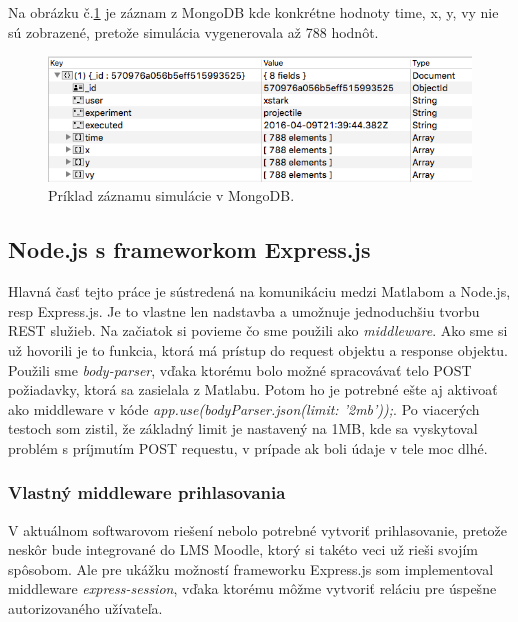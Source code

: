 Na obrázku č.\ref{img-mongo-record} je záznam z MongoDB kde konkrétne hodnoty time, x, y, vy nie sú zobrazené, pretože simulácia vygenerovala až 788 hodnôt.

\begin{figure}[H]
  \centering
  \includegraphics[scale=0.7]{img/code/mongodb-record.png}
  \caption{Príklad záznamu simulácie v MongoDB.}
  \label{img-mongo-record}
\end{figure}


\subsection{Node.js s frameworkom Express.js}
Hlavná časť tejto práce je sústredená na komunikáciu medzi Matlabom a Node.js, resp Express.js. Je to vlastne len nadstavba a umožnuje jednoduchšiu tvorbu REST služieb. Na začiatok si povieme čo sme použili ako \textit{middleware}. Ako sme si už hovorili je to funkcia, ktorá má prístup do request objektu a response objektu. Použili sme \textit{body-parser}, vďaka ktorému bolo možné spracovávať telo POST požiadavky, ktorá sa zasielala z Matlabu. Potom ho je potrebné ešte aj aktivoať ako middleware v kóde \textit{app.use(bodyParser.json({limit: '2mb'}));}. Po viacerých testoch som zistil, že základný limit je nastavený na 1MB, kde sa vyskytoval problém s príjmutím POST requestu, v prípade ak boli údaje v tele moc dlhé.

\subsubsection{Vlastný middleware prihlasovania}
V aktuálnom softwarovom riešení nebolo potrebné vytvoriť prihlasovanie, pretože neskôr bude integrované do LMS Moodle, ktorý si takéto veci už rieši svojím spôsobom. Ale pre ukážku možností frameworku Express.js som implementoval middleware \textit{express-session}, vďaka ktorému môžme vytvoriť reláciu pre úspešne autorizovaného užívateľa. 

